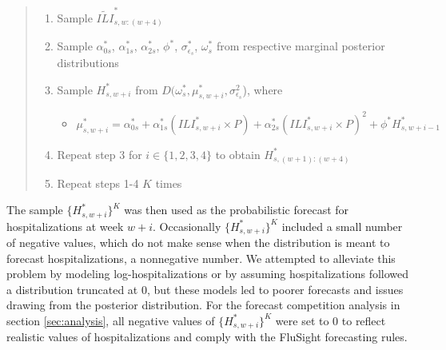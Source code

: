 \begin{quote}
\begin{enumerate}[Step 1:]
  \item Sample $\widetilde{ILI}^*_{s,w:(w + 4)}$
  \item Sample $\alpha_{0s}^*$, $\alpha_{1s}^*$, $\alpha_{2s}^*$, $\phi^*$, 
  $\sigma^*_{\epsilon_s}$, $\omega^*_s$ from respective marginal posterior 
  distributions
  \item Sample $H^*_{s,w + i}$ from $D(\omega_s^*, \mu_{s, w + i}^*,\sigma^2_{\epsilon_s}$), where
  \begin{itemize}
    \item[] $\mu_{s,w + i}^* = \alpha_{0s}^* + \alpha_{1s}^* (ILI_{s,w + i}^* \times P) + \alpha_{2s}^* (ILI_{s,w + i}^* \times P)^2 + \phi^* H^*_{s,w + i - 1}$
  \end{itemize}
   \item Repeat step 3 for $i \in \{1,2,3,4\}$ to obtain $H^*_{s,(w + 1):(w + 4)}$
  \item Repeat steps 1-4 $K$ times
\end{enumerate}
\end{quote}
The sample $\{H^*_{s,w + i}\}^K$ was then used as the probabilistic forecast 
for hospitalizations at week $w + i$. 
Occasionally $\{H^*_{s,w + i}\}^K$ included a small number of negative values,
which do not make sense when the distribution is meant to forecast
hospitalizations, a nonnegative number. We attempted to alleviate this problem
by modeling log-hospitalizations or by assuming hospitalizations followed a
distribution truncated at 0, but these models led to poorer forecasts
and issues drawing from the posterior distribution.
For the forecast competition analysis in 
section \ref{sec:analysis}, all negative values of $\{H^*_{s,w + i}\}^K$ were 
set to 0 to reflect realistic values of hospitalizations and comply with the 
FluSight forecasting rules.


















